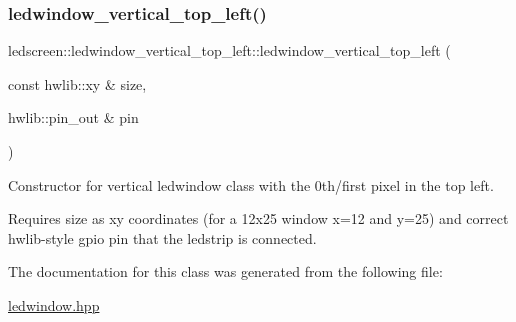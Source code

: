 \subsubsection{\texorpdfstring{ledwindow\+\_\+vertical\+\_\+top\+\_\+left()}{ledwindow\_vertical\_top\_left()}}
{\footnotesize\ttfamily ledscreen\+::ledwindow\+\_\+vertical\+\_\+top\+\_\+left\+::ledwindow\+\_\+vertical\+\_\+top\+\_\+left (\begin{DoxyParamCaption}\item[{const hwlib\+::xy \&}]{size,  }\item[{hwlib\+::pin\+\_\+out \&}]{pin }\end{DoxyParamCaption})\hspace{0.3cm}{\ttfamily [inline]}}



Constructor for vertical ledwindow class with the 0th/first pixel in the top left. 

Requires size as xy coordinates (for a 12x25 window x=12 and y=25) and correct hwlib-\/style gpio pin that the ledstrip is connected. 

The documentation for this class was generated from the following file\+:\begin{DoxyCompactItemize}
\item 
\hyperlink{ledwindow_8hpp}{ledwindow.\+hpp}\end{DoxyCompactItemize}
